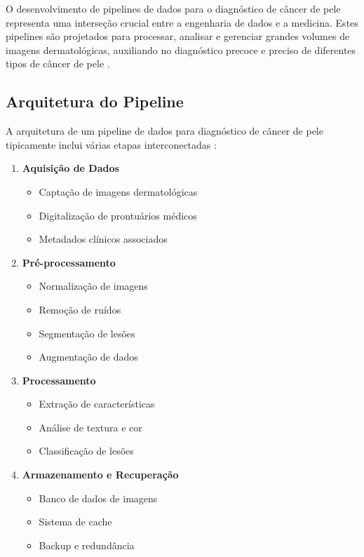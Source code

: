 O desenvolvimento de pipelines de dados para o diagnóstico de câncer de pele representa uma interseção crucial entre a engenharia de dados e a medicina. Estes pipelines são projetados para processar, analisar e gerenciar grandes volumes de imagens dermatológicas, auxiliando no diagnóstico precoce e preciso de diferentes tipos de câncer de pele \cite{zhang2021deep}.

\subsection{Arquitetura do Pipeline}

A arquitetura de um pipeline de dados para diagnóstico de câncer de pele tipicamente inclui várias etapas interconectadas \cite{esteva2022deep}:

\begin{enumerate}
\item \textbf{Aquisição de Dados}
\begin{itemize}
\item Captação de imagens dermatológicas
\item Digitalização de prontuários médicos
\item Metadados clínicos associados
\end{itemize}
\item \textbf{Pré-processamento}
\begin{itemize}
    \item Normalização de imagens
    \item Remoção de ruídos
    \item Segmentação de lesões
    \item Augmentação de dados
\end{itemize}

\item \textbf{Processamento}
\begin{itemize}
    \item Extração de características
    \item Análise de textura e cor
    \item Classificação de lesões
\end{itemize}

\item \textbf{Armazenamento e Recuperação}
\begin{itemize}
    \item Banco de dados de imagens
    \item Sistema de cache
    \item Backup e redundância
\end{itemize}
\end{enumerate}

